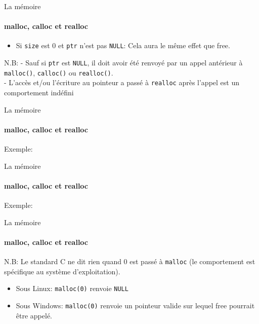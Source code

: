 \documentclass{beamer}
\begin{document}
\begin{darkframes}
	\begin{frame}{La mémoire}
		\framesubtitle{malloc, calloc et realloc}
		\begin{itemize}
			\item Si \texttt{size} est $0$ et \texttt{ptr} n'est pas \texttt{NULL}:  Cela aura le même effet que free.
		\end{itemize}
		\begin{alertblock}{N.B:}
			- Sauf si \texttt{ptr} est \texttt{NULL}, il doit avoir été renvoyé par un appel antérieur
			à \texttt{malloc()}, \texttt{calloc()} ou \texttt{realloc()}. \\
			- L'accès et/ou l'écriture au pointeur a passé à \texttt{realloc} après l'appel est un \alert{comportement indéfini}\\
		\end{alertblock}
	\end{frame}

	\begin{frame}{La mémoire}
		\framesubtitle{malloc, calloc et realloc}
		\begin{exampleblock}{Exemple:}
			\reallocExampleOne
		\end{exampleblock}
	\end{frame}

	\begin{frame}{La mémoire}
		\framesubtitle{malloc, calloc et realloc}
		\begin{exampleblock}{Exemple:}
			\reallocExampleTwo
		\end{exampleblock}
	\end{frame}

	\begin{frame}{La mémoire}
		\framesubtitle{malloc, calloc et realloc}
		\begin{alertblock}{N.B:}
			Le standard C ne dit rien quand 0 est passé à \texttt{malloc} (le comportement est spécifique au système d'exploitation).
			\begin{itemize}
				\item Sous Linux: \texttt{malloc(0)} renvoie \texttt{NULL}
				\item Sous Windows: \texttt{malloc(0)} renvoie un pointeur \alert{valide} sur lequel free pourrait être appelé.
			\end{itemize}
		\end{alertblock}
	\end{frame}


\end{darkframes}
\end{document}

